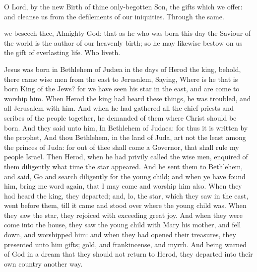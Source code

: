 
\secret\label{NativityMassIIISecret}
 O Lord, by the new Birth of thine only-begotten Son, the gifts which we offer: and cleanse us from the defilements of our iniquities. Through the same.


\postcommunion\label{NativityMassIIIPostcommunion}
 we beseech thee, Almighty God: that as he who was born this day the Saviour of the world is the author of our heavenly birth; so he may likewise bestow on us the gift of everlasting life. Who liveth.

 Jesus was born in Bethlehem of Jud{\ae}a in the days of Herod the king, behold, there came wise men from the east to Jerusalem, Saying, Where is he that is born King of the Jews? for we have seen his star in the east, and are come to worship him. When Herod the king had heard these things, he was troubled, and all Jerusalem with him. And when he had gathered all the chief priests and scribes of the people together, he demanded of them where Christ should be born. And they said unto him, In Bethlehem of Judaea: for thus it is written by the prophet, And thou Bethlehem, in the land of Juda, art not the least among the princes of Juda: for out of thee shall come a Governor, that shall rule my people Israel. Then Herod, when he had privily called the wise men, enquired of them diligently what time the star appeared. And he sent them to Bethlehem, and said, Go and search diligently for the young child; and when ye have found him, bring me word again, that I may come and worship him also. When they had heard the king, they departed; and, lo, the star, which they saw in the east, went before them, till it came and stood over where the young child was. When they saw the star, they rejoiced with exceeding great joy. And when they were come into the house, they saw the young child with Mary his mother, and fell down, and worshipped him: and when they had opened their treasures, they presented unto him gifts; gold, and frankincense, and myrrh. And being warned of God in a dream that they should not return to Herod, they departed into their own country another way.


\vfill

